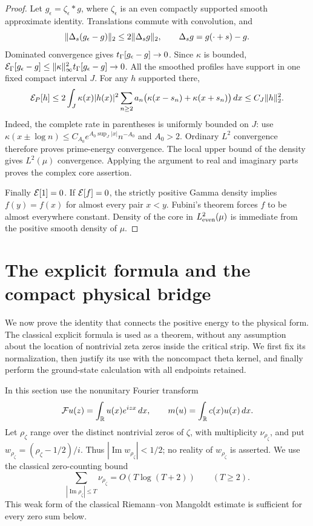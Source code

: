\begin{proof}
Let $g_\epsilon=\zeta_\epsilon*g$, where $\zeta_\epsilon$ is an even compactly supported smooth approximate identity. Translations commute with convolution, and
\[
 \lVert\Delta_s(g_\epsilon-g)\rVert_2\le2\lVert\Delta_sg\rVert_2,
 \qquad\Delta_sg=g(\cdot+s)-g.
\]
Dominated convergence gives $t_\Gamma[g_\epsilon-g]\to0$. Since $\kappa$ is bounded,
$\mathcal E_\Gamma[g_\epsilon-g]\le\lVert\kappa\rVert_\infty^2t_\Gamma[g_\epsilon-g]\to0$.
All the smoothed profiles have support in one fixed compact interval $J$. For any $h$ supported there,
\begin{equation}\label{eq:compactprimerate}
 \mathcal E_P[h]\le2\int_J\kappa(x)|h(x)|^2
     \sum_{n\ge2}a_n\bigl(\kappa(x-s_n)+\kappa(x+s_n)\bigr)\,dx
 \le C_J\lVert h\rVert_2^2.
\end{equation}
Indeed, the complete rate in parentheses is uniformly bounded on $J$: use $\kappa(x\pm\log n)\le C_{A_0}e^{A_0\sup_J|x|}n^{-A_0}$ and $A_0>2$. Ordinary $L^2$ convergence therefore proves prime-energy convergence. The local upper bound of the density gives $L^2(\mu)$ convergence. Applying the argument to real and imaginary parts proves the complex core assertion.

Finally $\mathcal E[1]=0$. If $\mathcal E[f]=0$, the strictly positive Gamma density implies $f(y)=f(x)$ for almost every pair $x<y$. Fubini's theorem forces $f$ to be almost everywhere constant. Density of the core in $L^2_{\mathrm{even}}(\mu)$ is immediate from the positive smooth density of $\mu$.
\end{proof}

\section{The explicit formula and the compact physical bridge}\label{sec:bridge}

We now prove the identity that connects the positive energy to the physical form. The classical explicit formula is used as a theorem, without any assumption about the location of nontrivial zeta zeros inside the critical strip. We first fix its normalization, then justify its use with the noncompact theta kernel, and finally perform the ground-state calculation with all endpoints retained.

In this section use the nonunitary Fourier transform
\[
 \mathcal Fu(z)=\int_\mathbb R u(x)e^{izx}\,dx,
 \qquad m(u)=\int_\mathbb R c(x)u(x)\,dx.
\]
Let $\rho_\zeta$ range over the distinct nontrivial zeros of $\zeta$, with multiplicity $\nu_{\rho_\zeta}$, and put $w_{\rho_\zeta}=(\rho_\zeta-1/2)/i$. Thus $|\operatorname{Im}w_{\rho_\zeta}|<1/2$; no reality of $w_{\rho_\zeta}$ is asserted. We use the classical zero-counting bound
\begin{equation}\label{eq:zerocount}
 \sum_{|\operatorname{Im}\rho_\zeta|\le T}\nu_{\rho_\zeta}
       =O(T\log(T+2))\qquad(T\ge2).
\end{equation}
This weak form of the classical Riemann--von Mangoldt estimate \cite[Theorem~0.1]{GarrettZeros} is sufficient for every zero sum below.

